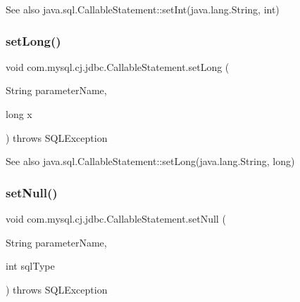 \begin{DoxySeeAlso}{See also}
java.\+sql.\+Callable\+Statement\+::set\+Int(java.\+lang.\+String, int) 
\end{DoxySeeAlso}
\mbox{\label{classcom_1_1mysql_1_1cj_1_1jdbc_1_1_callable_statement_a1b79292eddc7df78b2ef1b7e9ea614ed}} 
\subsubsection{\texorpdfstring{set\+Long()}{setLong()}}
{\footnotesize\ttfamily void com.\+mysql.\+cj.\+jdbc.\+Callable\+Statement.\+set\+Long (\begin{DoxyParamCaption}\item[{String}]{parameter\+Name,  }\item[{long}]{x }\end{DoxyParamCaption}) throws S\+Q\+L\+Exception}

\begin{DoxySeeAlso}{See also}
java.\+sql.\+Callable\+Statement\+::set\+Long(java.\+lang.\+String, long) 
\end{DoxySeeAlso}
\mbox{\label{classcom_1_1mysql_1_1cj_1_1jdbc_1_1_callable_statement_a75fd7895affb02fdb0d77a4093554b89}} 
\subsubsection{\texorpdfstring{set\+Null()}{setNull()}\hspace{0.1cm}{\footnotesize\ttfamily [1/2]}}
{\footnotesize\ttfamily void com.\+mysql.\+cj.\+jdbc.\+Callable\+Statement.\+set\+Null (\begin{DoxyParamCaption}\item[{String}]{parameter\+Name,  }\item[{int}]{sql\+Type }\end{DoxyParamCaption}) throws S\+Q\+L\+Exception}

